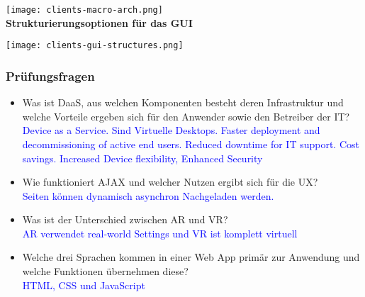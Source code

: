 \texttt{[image: clients-macro-arch.png]} \\

\textbf{Strukturierungsoptionen für das GUI}

\texttt{[image: clients-gui-structures.png]}

\subsubsection{Prüfungsfragen}

\begin{itemize}
    \item Was ist DaaS, aus welchen Komponenten besteht deren Infrastruktur und welche Vorteile ergeben sich für den Anwender sowie den Betreiber der IT? \\
    \textcolor{blue}{Device as a Service. Sind Virtuelle Desktops. Faster deployment and decommissioning of active end users. Reduced downtime for IT support. Cost savings. Increased Device flexibility, Enhanced Security}
    \item Wie funktioniert AJAX und welcher Nutzen ergibt sich für die UX? \\
    \textcolor{blue}{Seiten können dynamisch asynchron Nachgeladen werden.}
    \item Was ist der Unterschied zwischen AR und VR? \\
    \textcolor{blue}{AR verwendet real-world Settings und VR ist komplett virtuell}
    \item Welche drei Sprachen kommen in einer Web App primär zur Anwendung und welche Funktionen übernehmen diese? \\
    \textcolor{blue}{HTML, CSS und JavaScript}
\end{itemize}
